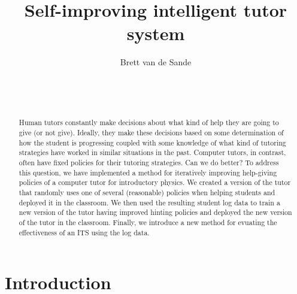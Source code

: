 \documentclass{edm_template}
\begin{document}
\title{Self-improving intelligent tutor system}
\author{
\alignauthor
      Brett van de Sande\\
       \\
       \\
       \\
}
\maketitle

%



\begin{abstract}
Human tutors constantly make decisions about
what kind of help they are going to give (or not give).  Ideally,
they make these decisions based on some determination of how
the student is progressing coupled with some knowledge of what kind
of tutoring strategies have worked in similar situations in the past.
Computer tutors, in contrast, often have fixed policies for their
tutoring strategies.   Can we do better?  To address this question, 
we have implemented a method for iteratively improving 
help-giving policies of a computer tutor for introductory physics.  
We created a version of the tutor that randomly uses one of several 
(reasonable) policies when helping students and deployed it in the
classroom.  We then used the resulting student log data to 
train a new version of the tutor having improved hinting policies
and deployed the new version of the tutor in the classroom.  
Finally, we introduce a new method for evuating the effectiveness 
of an ITS using the log data.
\end{abstract}


\section{Introduction}
 
\end{document}
